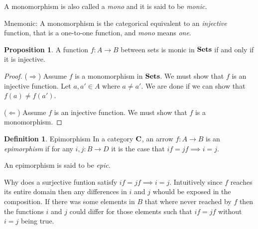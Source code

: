 \documentclass{book}
\theoremstyle{definition}
\newtheorem{definition}{Definition}[section]
\newtheorem{proposition}{Proposition}
\begin{document}
A monomorphism is also called a \emph{mono} and it is said to be \emph{monic}.

Mnemonic: A monomorphism is the categorical equivalent to an \emph{injective}
function, that is a one-to-one function, and \emph{mono} means \emph{one}.

\begin{proposition}
  A function $f : A \to B$ between sets is monic in $\bf{Sets}$ if and only if it
  is injective.
\end{proposition}
\begin{proof}
  ($\Rightarrow$) Assume $f$ is a monomorphism in $\bf{Sets}$. We must show that
  $f$ is an injective function. Let $a, a' \in A$ where $a \neq a'$. We are done
  if we can show that $f(a) \neq f(a')$.

  ($\Leftarrow$) Assume $f$ is an injective function. We must show that $f$ is a
  monomorphism.
\end{proof}

\begin{definition}{Epimorphism}
  In a category $\bf{C}$, an arrow $f : A \to B$ is an \emph{epimorphism} if for
  any $i, j : B \to D$ it is the case that $if = jf \implies i = j$.


  An epimorphism is said to be \emph{epic}.
\end{definition}

Why does a surjective funtion satisfy $if = jf \implies i = j$. Intuitively
since $f$ reaches its entire domain then any differences in $i$ and $j$ whould
be exposed in the composition. If there was some elements in $B$ that where
never reached by $f$ then the functions $i$ and $j$ could differ for those
elements such that $if = jf$ without $i = j$ being true.
\end{document}
